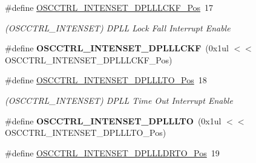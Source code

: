 \begin{DoxyCompactItemize}
\item 
\hypertarget{group___s_a_m_l21___o_s_c_c_t_r_l_ga787080bd2401b450bf6c5d2b1c0a550c}{}\#define \hyperlink{group___s_a_m_l21___o_s_c_c_t_r_l_ga787080bd2401b450bf6c5d2b1c0a550c}{O\+S\+C\+C\+T\+R\+L\+\_\+\+I\+N\+T\+E\+N\+S\+E\+T\+\_\+\+D\+P\+L\+L\+L\+C\+K\+F\+\_\+\+Pos}~17\label{group___s_a_m_l21___o_s_c_c_t_r_l_ga787080bd2401b450bf6c5d2b1c0a550c}

\begin{DoxyCompactList}\small\item\em (O\+S\+C\+C\+T\+R\+L\+\_\+\+I\+N\+T\+E\+N\+S\+E\+T) D\+P\+L\+L Lock Fall Interrupt Enable \end{DoxyCompactList}\item 
\hypertarget{group___s_a_m_l21___o_s_c_c_t_r_l_gac6c9026d1ca24ede1c63dc9163f91130}{}\#define {\bfseries O\+S\+C\+C\+T\+R\+L\+\_\+\+I\+N\+T\+E\+N\+S\+E\+T\+\_\+\+D\+P\+L\+L\+L\+C\+K\+F}~(0x1ul $<$$<$ O\+S\+C\+C\+T\+R\+L\+\_\+\+I\+N\+T\+E\+N\+S\+E\+T\+\_\+\+D\+P\+L\+L\+L\+C\+K\+F\+\_\+\+Pos)\label{group___s_a_m_l21___o_s_c_c_t_r_l_gac6c9026d1ca24ede1c63dc9163f91130}

\item 
\hypertarget{group___s_a_m_l21___o_s_c_c_t_r_l_gaaf1aeffd30014c1a3da9ec06db18042e}{}\#define \hyperlink{group___s_a_m_l21___o_s_c_c_t_r_l_gaaf1aeffd30014c1a3da9ec06db18042e}{O\+S\+C\+C\+T\+R\+L\+\_\+\+I\+N\+T\+E\+N\+S\+E\+T\+\_\+\+D\+P\+L\+L\+L\+T\+O\+\_\+\+Pos}~18\label{group___s_a_m_l21___o_s_c_c_t_r_l_gaaf1aeffd30014c1a3da9ec06db18042e}

\begin{DoxyCompactList}\small\item\em (O\+S\+C\+C\+T\+R\+L\+\_\+\+I\+N\+T\+E\+N\+S\+E\+T) D\+P\+L\+L Time Out Interrupt Enable \end{DoxyCompactList}\item 
\hypertarget{group___s_a_m_l21___o_s_c_c_t_r_l_gae6285877e7ce36561b98bfb1ea84493c}{}\#define {\bfseries O\+S\+C\+C\+T\+R\+L\+\_\+\+I\+N\+T\+E\+N\+S\+E\+T\+\_\+\+D\+P\+L\+L\+L\+T\+O}~(0x1ul $<$$<$ O\+S\+C\+C\+T\+R\+L\+\_\+\+I\+N\+T\+E\+N\+S\+E\+T\+\_\+\+D\+P\+L\+L\+L\+T\+O\+\_\+\+Pos)\label{group___s_a_m_l21___o_s_c_c_t_r_l_gae6285877e7ce36561b98bfb1ea84493c}

\item 
\hypertarget{group___s_a_m_l21___o_s_c_c_t_r_l_gaf3a56404bea06f5c0a4388511df31675}{}\#define \hyperlink{group___s_a_m_l21___o_s_c_c_t_r_l_gaf3a56404bea06f5c0a4388511df31675}{O\+S\+C\+C\+T\+R\+L\+\_\+\+I\+N\+T\+E\+N\+S\+E\+T\+\_\+\+D\+P\+L\+L\+L\+D\+R\+T\+O\+\_\+\+Pos}~19\label{group___s_a_m_l21___o_s_c_c_t_r_l_gaf3a56404bea06f5c0a4388511df31675}


\end{DoxyCompactItemize}
